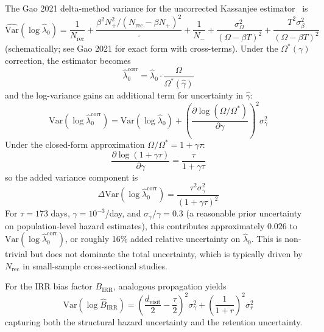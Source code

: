 \documentclass[11pt]{article}
\begin{document}
The Gao 2021 delta-method variance for the uncorrected Kassanjee estimator~\cite{gao2021} is
\begin{equation}
\widehat{\mathrm{Var}}(\log \hat\lambda_0) = \frac{1}{N_{\mathrm{rec}}} + \frac{\beta^2 N_+^2 / (N_{\mathrm{rec}} - \beta N_+)^2}{\cdot} + \frac{1}{N_-} + \frac{\sigma_\Omega^2}{(\Omega-\beta T)^2} + \frac{T^2 \sigma_\beta^2}{(\Omega-\beta T)^2}
\end{equation}
(schematically; see Gao 2021 for exact form with cross-terms). Under the $\Omega^*(\gamma)$ correction, the estimator becomes
\begin{equation}
\hat\lambda_0^{\mathrm{corr}} = \hat\lambda_0 \cdot \frac{\Omega}{\Omega^*(\hat\gamma)}
\end{equation}
and the log-variance gains an additional term for uncertainty in $\hat\gamma$:
\begin{equation}
\mathrm{Var}(\log \hat\lambda_0^{\mathrm{corr}}) = \mathrm{Var}(\log \hat\lambda_0) + \left(\frac{\partial \log(\Omega/\Omega^*)}{\partial \gamma}\right)^2 \sigma_\gamma^2
\end{equation}
Under the closed-form approximation $\Omega/\Omega^* = 1 + \gamma\tau$:
\begin{equation}
\frac{\partial \log(1 + \gamma\tau)}{\partial \gamma} = \frac{\tau}{1 + \gamma\tau}
\end{equation}
so the added variance component is
\begin{equation}
\Delta\mathrm{Var}(\log \hat\lambda_0^{\mathrm{corr}}) = \frac{\tau^2 \sigma_\gamma^2}{(1 + \gamma\tau)^2} \label{eq:added_var}
\end{equation}
For $\tau = 173$ days, $\gamma = 10^{-3}$/day, and $\sigma_\gamma / \gamma = 0.3$ (a reasonable prior uncertainty on population-level hazard estimates), this contributes approximately $0.026$ to $\mathrm{Var}(\log \hat\lambda_0^{\mathrm{corr}})$, or roughly 16\% added relative uncertainty on $\hat\lambda_0$. This is non-trivial but does not dominate the total uncertainty, which is typically driven by $N_{\mathrm{rec}}$ in small-sample cross-sectional studies.

For the IRR bias factor $B_{\mathrm{IRR}}$, analogous propagation yields
\begin{equation}
\mathrm{Var}(\log \widehat{B}_{\mathrm{IRR}}) = \left(\frac{d_{\mathrm{visit}}}{2} - \frac{\tau}{2}\right)^2 \sigma_\gamma^2 + \left(\frac{1}{1+r}\right)^2 \sigma_r^2
\end{equation}
capturing both the structural hazard uncertainty and the retention uncertainty.
\end{document}
